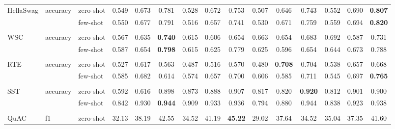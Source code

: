 \begin{tabular}{lll<{\hspace{0.8 ex}}>{\hspace{0.8 ex}}ccc<{\hspace{0.8 ex}}>{\hspace{0.8 ex}}ccc<{\hspace{0.8 ex}}>{\hspace{0.8 ex}}ccc<{\hspace{0.8 ex}}>{\hspace{0.8 ex}}ccc<{\hspace{0.8 ex}}}
    HellaSwag              & accuracy    & zero-shot     & 0.549 & 0.673 & 0.781 &  0.528 &  0.672 & 0.753 &  0.507 & 0.646 & 0.743 &  0.552 &  0.690 & \textbf{0.807}  \\
                           &             & few-shot      & 0.550 & 0.677 & 0.791 &  0.516 &  0.657 & 0.741 &  0.530 & 0.671 & 0.759 &  0.559 &  0.694 & \textbf{0.820}  \\
                           &             &               &       &       &       &        &        &       &        &       &       &        &        &       \\
    WSC                    & accuracy    & zero-shot     & 0.567 & 0.635 & \textbf{0.740} &  0.615 &  0.606 & 0.654 &  0.663 & 0.654 & 0.683 &  0.692 &  0.587 & 0.731 \\
                           &             & few-shot      & 0.587 & 0.654 & \textbf{0.798} &  0.615 &  0.625 & 0.779 &  0.625 & 0.596 & 0.654 &  0.644 &  0.673 & 0.788 \\
                           &             &               &       &       &       &        &        &       &        &       &       &        &        &       \\
    RTE                    & accuracy    & zero-shot     & 0.527 & 0.617 & 0.563 &  0.487 &  0.516 & 0.570 &  0.480 & \textbf{0.708} & 0.704 &  0.538 &  0.657 & 0.668 \\
                           &             & few-shot      & 0.585 & 0.682 & 0.614 &  0.574 &  0.657 & 0.700 &  0.606 & 0.585 & 0.711 &  0.545 &  0.697 & \textbf{0.765}  \\
                           &             &               &       &       &       &        &        &       &        &       &       &        &        &       \\
    SST                    & accuracy    & zero-shot     & 0.592 & 0.616 & 0.898 &  0.873 &  0.888 & 0.907 &  0.817 & 0.820 & \textbf{0.920} &  0.812 &  0.901 & 0.900 \\
                           &             & few-shot      & 0.842 & 0.930 & \textbf{0.944} &  0.909 &  0.933 & 0.936 &  0.794 & 0.880 & 0.944 &  0.838 &  0.923 & 0.938 \\
                           &             &               &       &       &       &        &        &       &        &       &       &        &        &       \\
    QuAC                   & f1          & zero-shot     & 32.13 & 38.19 & 42.55 &  34.52 &  41.19 & \textbf{45.22} &  29.02 & 37.64 & 34.52 &  35.04 &  37.35 & 41.60 \\

\end{tabular}
